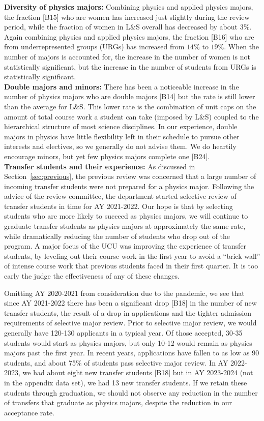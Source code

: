 \documentclass[12pt]{article}
\begin{document}
\noindent
{\bf Diversity of physics majors:} Combining physics and applied
physics majors, the fraction [B15] who are women has increased just
slightly during the review period, while the fraction of women in L\&S
overall has decreased by about $3\%$.  Again combining physics and
applied physics majors, the fraction [B16] who are from
underrepresented groups (URGs) has increased from $14\%$ to $19\%$.
When the number of majors is accounted for, the increase in the number
of women is not statistically significant, but the increase in the
number of students from URGs is statistically significant.\\[3pt]

\noindent
{\bf Double majors and minors:} There has been a noticeable increase
in the number of physics majors who are double majors [B14] but the
rate is still lower than the average for L\&S.  This lower rate is the
combination of unit caps on the amount of total course work a student
can take (imposed by L\&S) coupled to the hierarchical structure of
most science disciplines.  In our experience, double majors in physics
have little flexibility left in their schedule to pursue other
interests and electives, so we generally do not advise them.  We do
heartily encourage minors, but yet few physics majors complete one
[B24].\\[3pt]

\noindent
{\bf Transfer students and their experience:} As discussed in
Section~\ref{sec:previous}, the previous review was concerned that a
large number of incoming transfer students were not prepared for a
physics major.  Following the advice of the review committee, the
department started selective review of transfer students in time for
AY 2021-2022.  Our hope is that by selecting students who are more
likely to succeed as physics majors, we will continue to graduate
transfer students as physics majors at approximately the same rate,
while dramatically reducing the number of students who drop out of the
program.  A major focus of the UCU was improving the experience of
transfer students, by leveling out their course work in the first year
to avoid a ``brick wall'' of intense course work that previous
students faced in their first quarter.  It is too early the judge the
effectiveness of any of these changes.

Omitting AY 2020-2021 from consideration due to the pandemic, we see
that since AY 2021-2022 there has been a significant drop [B18] in the
number of new transfer students, the result of a drop in applications
and the tighter admission requirements of selective major review.
Prior to selective major review, we would generally have
120-130 applicants in a typical year.  Of those accepted, 30-35 students would
start as physics majors, but only 10-12 would remain as
physics majors past the first year.  In recent years, applications
have fallen to as low as 90 students, and about 75\% of
students pass selective major review.  In AY 2022-2023, we had about
eight new transfer students [B18] but in AY 2023-2024 (not in the
appendix data set), we had 13 new transfer students.  If we retain
these students through graduation, we should not observe any reduction in
the number of transfers that graduate as physics majors, despite the
reduction in our acceptance rate.
\end{document}
